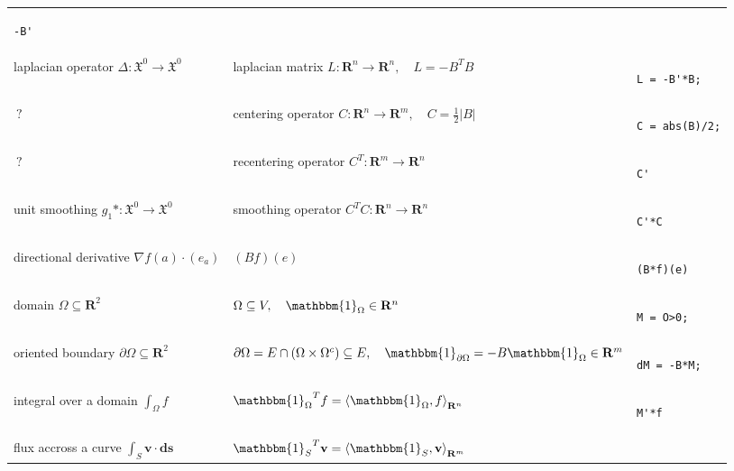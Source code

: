 \documentclass{article}
\def\R{\mathbf{R}}
\begin{document}
\begin{tabular}{l|l|b{}}
\begin{verbatim}
-B'
\end{verbatim}
\\
laplacian operator $\Delta:\mathfrak{X}^0\to\mathfrak{X}^0$ &
laplacian matrix $L:\R^n\to\R^n,\quad L=-B^TB$ &
\begin{verbatim}
L = -B'*B;
\end{verbatim}
\\
$\ ?$ &
	centering operator $C:\R^n\to\R^m,\quad C=\frac{1}{2}|B|$ &
\begin{verbatim}
C = abs(B)/2;
\end{verbatim}
\\
$\ ?$ &
recentering operator $C^T:\R^m\to\R^n$ &
\begin{verbatim}
C'
\end{verbatim}
\\
unit smoothing $g_1*:\mathfrak{X}^0\to\mathfrak{X}^0$ &
smoothing operator $C^TC:\R^n\to\R^n$ &
\begin{verbatim}
C'*C
\end{verbatim}
\\
directional derivative $\nabla f(a)\cdot(e_a)$ &
$(Bf)(e)$ &
\begin{verbatim}
(B*f)(e)
\end{verbatim}
\\
domain $\Omega\subseteq\R^2$ & $\Omega\subseteq V,\quad\mathbbm{1}_\Omega\in\R^n$ &
\begin{verbatim}
M = O>0;
\end{verbatim}
\\
oriented boundary $\partial\Omega\subseteq\R^2$ & $\partial\Omega=E\cap(\Omega\times\Omega^c)\subseteq E,\quad \mathbbm{1}_{\partial\Omega}=-B\mathbbm{1}_\Omega\in\R^m$ &
\begin{verbatim}
dM = -B*M;
\end{verbatim}
\\
integral over a domain $\int_\Omega f$ &
${\mathbbm{1}_\Omega}^T f = \left\langle\mathbbm{1}_\Omega,f\right\rangle_{\R^n}$ &
\begin{verbatim}
M'*f
\end{verbatim}
\\
flux accross a curve $\int_{S}\mathbf{v}\cdot\mathbf{ds}$ &
${\mathbbm{1}_S}^T\mathbf{v} = \left\langle\mathbbm{1}_S,\mathbf{v}\right\rangle_{\R^m}$ &

\end{tabular}
\end{document}
